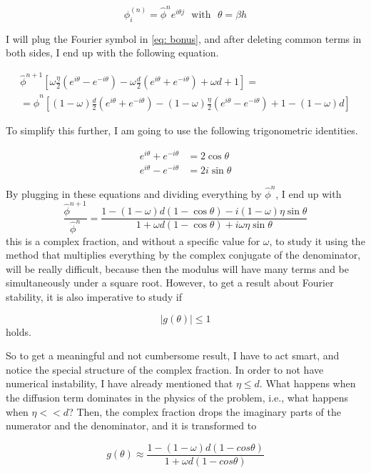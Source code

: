 \[
	\phi_{i}^{(n)} = \hat{\phi}^n e^{i \theta j } \,\, \text{ with } \,\, \theta = \beta h
\]

I will plug the Fourier symbol in \ref{eq: bonus}, and after deleting common terms in both sides, I end up with the following equation.

\begin{gather*}
	\hat{\phi}^{n+1} \left[ \omega \frac{\eta}{2} \left( e^{i\theta} - e^{-i\theta} \right) - \omega \frac{d}{2} \left( e^{i\theta} + e^{-i\theta} \right) + \omega d + 1 \right] = \\
	= \hat{\phi}^{n} \left[ (1-\omega) \frac{d}{2} \left( e^{i\theta} + e^{-i\theta} \right) - (1 - \omega) \frac{\eta}{2} \left( e^{i\theta} - e^{-i\theta} \right) + 1 - (1-\omega)d \right]
\end{gather*}

To simplify this further, I am going to use the following trigonometric identities.

\begin{align*}
	e^{i\theta} + e^{-i\theta} &= 2 \cos\theta \\
	e^{i\theta} - e^{-i\theta} &= 2i \sin\theta
\end{align*}

By plugging in these equations and dividing everything by \( \hat{\phi}^{n} \), I end up with
\[
	\frac{\hat{\phi}^{n+1}}{\hat{\phi}^{n}} = \frac{1 - (1-\omega)d(1 - \cos\theta ) - i (1-\omega)\eta\sin\theta}{1 + \omega d (1 - \cos\theta) + i \omega \eta \sin\theta}
\]
this is a complex fraction, and without a specific value for \( \omega \), to study it using the method that multiplies everything by the complex conjugate of the denominator, will be really difficult, because then the modulus will have many terms and be simultaneously under a square root. However, to get a result about Fourier stability, it is also imperative to study if

\[
	|g(\theta)| \leq 1
\]
holds.

So to get a meaningful and not cumbersome result, I have to act smart, and notice the special structure of the complex fraction. In order to not have numerical instability, I have already mentioned that \( \eta \leq d \). What happens when the diffusion term dominates in the physics of the problem, i.e., what happens when \( \eta << d \)? Then, the complex fraction drops the imaginary parts of the numerator and the denominator, and it is transformed to 

\[
	g(\theta) \approx \frac{1 - (1 - \omega)d(1-cos\theta)}{1 + \omega d (1-cos\theta)}
\]

